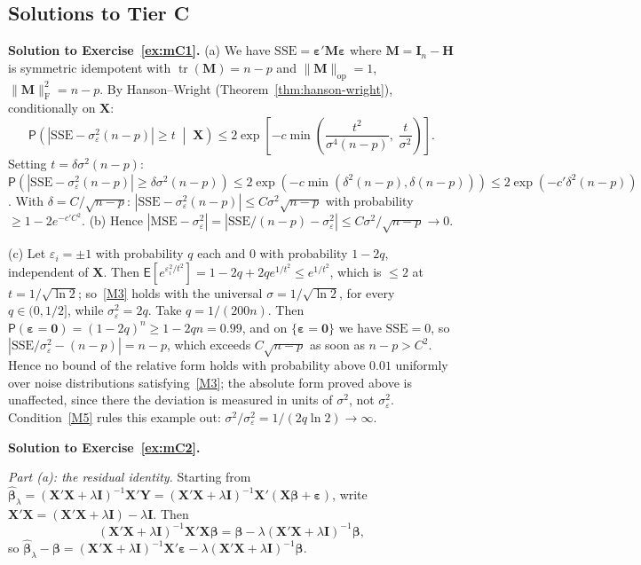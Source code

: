 \documentclass[12pt,a4paper]{article}
\theoremstyle{definition}
\newcommand\expc{\mathsf{E}}
\newcommand\prb{\mathsf{P}}
\DeclareMathOperator\tr{tr}
\newcommand{\SSE}{\mathrm{SSE}}
\newcommand{\MSE}{\mathrm{MSE}}
\newcommand{\bX}{\mathbf{X}}
\newcommand{\bY}{\mathbf{Y}}
\def\bb{\boldsymbol{\beta}}
\newcommand{\be}{\boldsymbol{\varepsilon}}
\newcommand{\bI}{\mathbf{I}}
\newcommand{\bH}{\mathbf{H}}
\newcommand{\bM}{\mathbf{M}}
\newcommand{\bzero}{\mathbf{0}}
\newcommand{\hbb}{\hat{\boldsymbol{\beta}}}
\newcommand{\opnorm}[1]{\|#1\|_{\mathrm{op}}}
\newcommand{\fnorm}[1]{\|#1\|_{\mathrm{F}}}
\begin{document}
\subsection*{Solutions to Tier C}

\textbf{Solution to Exercise~\ref{ex:mC1}.} (a) We have $\SSE = \be'\bM\be$ where $\bM = \bI_n - \bH$ is symmetric idempotent with $\tr(\bM) = n - p$ and $\opnorm{\bM} = 1$, $\fnorm{\bM}^2 = n - p$. By Hanson--Wright (Theorem~\ref{thm:hanson-wright}), conditionally on $\bX$:
\[
\prb\!\left(|\SSE - \sigma_\varepsilon^2(n-p)| \geqslant t \;\middle|\; \bX\right) \leqslant 2\exp\!\left[-c\min\!\left(\frac{t^2}{\sigma^4(n-p)},\; \frac{t}{\sigma^2}\right)\right].
\]
Setting $t = \delta\sigma^2(n-p)$: $\prb(|\SSE - \sigma_\varepsilon^2(n-p)| \geqslant \delta\sigma^2(n-p)) \leqslant 2\exp(-c\min(\delta^2(n-p), \delta(n-p))) \leqslant 2\exp(-c'\delta^2(n-p))$. With $\delta = C/\sqrt{n-p}$: $|\SSE - \sigma_\varepsilon^2(n-p)| \leqslant C\sigma^2\sqrt{n-p}$ with probability $\geqslant 1 - 2e^{-c'C^2}$. (b) Hence $|\MSE - \sigma_\varepsilon^2| = |\SSE/(n-p) - \sigma_\varepsilon^2| \leqslant C\sigma^2/\sqrt{n-p} \to 0$.

(c) Let $\varepsilon_i = \pm 1$ with probability $q$ each and $0$ with probability $1 - 2q$, independent of $\bX$. Then $\expc[e^{\varepsilon_i^2/t^2}] = 1 - 2q + 2qe^{1/t^2} \leqslant e^{1/t^2}$, which is $\leqslant 2$ at $t = 1/\sqrt{\ln 2}$; so~\ref{M3} holds with the universal $\sigma = 1/\sqrt{\ln 2}$, for every $q \in (0, 1/2]$, while $\sigma_\varepsilon^2 = 2q$. Take $q = 1/(200n)$. Then $\prb(\be = \bzero) = (1 - 2q)^n \geqslant 1 - 2qn = 0.99$, and on $\{\be = \bzero\}$ we have $\SSE = 0$, so $|\SSE/\sigma_\varepsilon^2 - (n-p)| = n - p$, which exceeds $C\sqrt{n-p}$ as soon as $n - p > C^2$. Hence no bound of the relative form holds with probability above $0.01$ uniformly over noise distributions satisfying~\ref{M3}; the absolute form proved above is unaffected, since there the deviation is measured in units of $\sigma^2$, not $\sigma_\varepsilon^2$. Condition~\ref{M5} rules this example out: $\sigma^2/\sigma_\varepsilon^2 = 1/(2q\ln 2) \to \infty$.

\textbf{Solution to Exercise~\ref{ex:mC2}.}

\emph{Part (a): the residual identity.} Starting from $\hbb_\lambda = (\bX'\bX + \lambda\bI)^{-1}\bX'\bY = (\bX'\bX + \lambda\bI)^{-1}\bX'(\bX\bb + \be)$, write $\bX'\bX = (\bX'\bX + \lambda\bI) - \lambda\bI$. Then
\[
(\bX'\bX + \lambda\bI)^{-1}\bX'\bX\bb = \bb - \lambda(\bX'\bX + \lambda\bI)^{-1}\bb,
\]
so $\hbb_\lambda - \bb = (\bX'\bX + \lambda\bI)^{-1}\bX'\be - \lambda(\bX'\bX + \lambda\bI)^{-1}\bb$.
\end{document}
